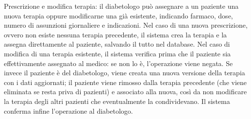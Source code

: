 Prescrizione e modifica terapia: il diabetologo può assegnare a un paziente una nuova terapia oppure modificarne una già esistente, indicando farmaco, dose, numero di assunzioni giornaliere e indicazioni. Nel caso di una nuova prescrizione, ovvero non esiste nessuna terapia precedente, il sistema crea la terapia e la assegna direttamente al paziente, salvando il tutto nel database. Nel caso di modifica di una terapia esistente, il sistema verifica prima che il paziente sia effettivamente assegnato al medico: se non lo è, l'operazione viene negata. Se invece il paziente è del diabetologo, viene creata una nuova versione della terapia con i dati aggiornati; il paziente viene rimosso dalla terapia precedente (che viene eliminata se resta priva di pazienti) e associato alla nuova, così da non modificare la terapia degli altri pazienti che eventualmente la condividevano. Il sistema conferma infine l'operazione al diabetologo.\\


